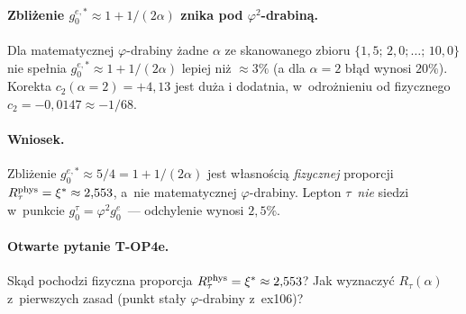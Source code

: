\begin{observation}[Matematyczna $\varphi$-drabina daje
  $g_0^{e,*}(\alpha=2)=1{,}508 \neq 5/4$ (\texttt{ex137}, 6/16~PASS)]
  \paragraph{Zbli\.zenie $g_0^{e,*}\approx 1+1/(2\alpha)$ znika
    pod $\varphi^2$-drabin\k{a}.}
  Dla matematycznej $\varphi$-drabiny \.zadne $\alpha$ ze skanowanego
  zbioru $\{1{,}5;\,2{,}0;\ldots;\,10{,}0\}$ nie spe\l{}nia
  $g_0^{e,*} \approx 1+1/(2\alpha)$ lepiej ni\.z
  $\approx 3\%$ (a dla $\alpha=2$ b\l\k{a}d wynosi $20\%$).
  Korekta $c_2(\alpha=2)=+4{,}13$ jest du\.za i dodatnia,
  w~odro\.znieniu od fizycznego $c_2=-0{,}0147\approx -1/68$.

  \paragraph{Wniosek.}
  Zbli\.zenie $g_0^{e,*}\approx 5/4 = 1+1/(2\alpha)$ jest
  w\l{}asno\'sci\k{a} \emph{fizycznej} proporcji $R_\tau^{\rm phys}
  = \xi^* \approx 2{,}553$, a~nie matematycznej $\varphi$-drabiny.
  Lepton $\tau$~\emph{nie} siedzi w~punkcie $g_0^\tau = \varphi^2
  g_0^e$~--- odchylenie wynosi $2{,}5\%$.

  \paragraph{Otwarte pytanie T-OP4e.}
  Sk\k{a}d pochodzi fizyczna proporcja $R_\tau^{\rm phys}=\xi^*
  \approx 2{,}553$?  Jak wyznaczy\'c $R_\tau(\alpha)$ z~pierwszych
  zasad (punkt sta\l{}y $\varphi$-drabiny z~ex106)?
\end{observation}

